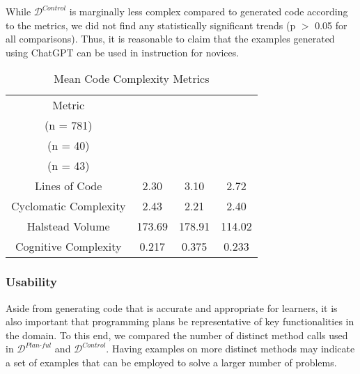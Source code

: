 While \(\mathcal{D}^{\textit{Control}}\) is marginally less complex compared to generated code according to the metrics, we did not find any statistically significant trends (p $>$ 0.05 for all comparisons). Thus, it is reasonable to claim that the examples generated using ChatGPT can be used in instruction for novices.

% 


\begin{table}
\caption{Mean Code Complexity Metrics}
    \centering
    \label{tab:metrics_appropriateness}
    \begin{tabular}{cccc}
    \toprule
        Metric & \thead{\(\mathcal{D}^{\textit{Plan-ful}}\) \\ (n = 781)} & \thead{\(\mathcal{D}^{\textit{Plan-ful*}}\) \\ (n = 40)} & \thead{\(\mathcal{D}^{\textit{Control}}\) \\ (n = 43)}
    \\\midrule
        Lines of Code & 2.30 & 3.10 &  2.72 \\
        Cyclomatic Complexity & 2.43 & 2.21 & 2.40 \\
        Halstead Volume & 173.69 & 178.91 & 114.02 \\
        Cognitive Complexity & 0.217 & 0.375 & 0.233 \\
    \end{tabular}
\end{table}


\subsubsection{Usability}
\label{sec:quant_usability}

Aside from generating code that is accurate and appropriate for learners, it is also important that programming plans be representative of key functionalities in the domain.
To this end, we compared the number of distinct method calls used in \(\mathcal{D}^{\textit{Plan-ful}}\) and \(\mathcal{D}^{\textit{Control}}\). Having examples on more distinct methods may indicate a set of examples that can be employed to solve a larger number of problems.%

